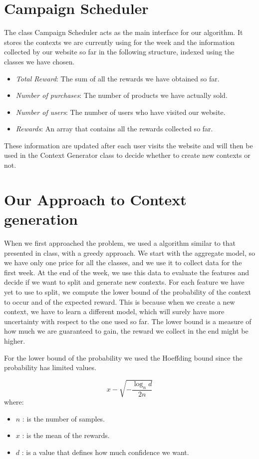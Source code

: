 \section{Campaign Scheduler}\label{sec:campaign-scheduler}
The class Campaign Scheduler acts as the main interface for our algorithm.
It stores the contexts we are currently using for the week and the information collected by our website so far in the following structure, indexed using the classes we have chosen.
\begin{itemize}
	\item \textit{Total Reward}: The sum of all the rewards we have obtained so far.
	\item \textit{Number of purchases}: The number of products we have actually sold.
	\item \textit{Number of users}: The number of users who have visited our website.
    \item \textit{Rewards}: An array that contains all the rewards collected so far.
\end{itemize}
These information are updated after each user visits the website and will then be used in the Context Generator class to decide whether to create new contexts or not.

\section{Our Approach to Context generation}\label{sec:our-approach-to-context-generation}
When we first approached the problem, we used a algorithm similar to that presented in class, with a greedy approach.
We start with the aggregate model, so we have only one price for all the classes, and we use it to collect data for the first week.
At the end of the week, we use this data to evaluate the features and decide if we want to split and generate new contexts.
For each feature we have yet to use to split, we compute the lower bound of the probability of the context to occur and of the expected reward.
This is because when we create a new context, we have to learn a different model, which will surely have more uncertainty with respect to the one used so far.
The lower bound is a measure of how much we are guaranteed to gain, the reward we collect in the end might be higher.

	For the lower bound of the probability we used the Hoeffding bound since the probability has limited values.

\begin{equation}
	x - \sqrt{-\frac{\log_n{d}} {2 n}}
\end{equation}
where:
\begin{itemize}
	\item $n$ : is the number of samples.
	\item $x$ : is the mean of the rewards.
	\item $d$ : is a value that defines how much confidence we want.
\end{itemize}

